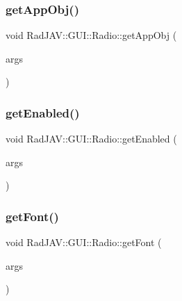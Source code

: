 \subsubsection{\texorpdfstring{get\+App\+Obj()}{getAppObj()}}
{\footnotesize\ttfamily void Rad\+J\+A\+V\+::\+G\+U\+I\+::\+Radio\+::get\+App\+Obj (\begin{DoxyParamCaption}\item[{const v8\+::\+Function\+Callback\+Info$<$ v8\+::\+Value $>$ \&}]{args }\end{DoxyParamCaption})\hspace{0.3cm}{\ttfamily [static]}}

\mbox{\label{class_rad_j_a_v_1_1_g_u_i_1_1_radio_a6dd9ce2bf30ab761488f3c3a745ae208}} 
\subsubsection{\texorpdfstring{get\+Enabled()}{getEnabled()}}
{\footnotesize\ttfamily void Rad\+J\+A\+V\+::\+G\+U\+I\+::\+Radio\+::get\+Enabled (\begin{DoxyParamCaption}\item[{const v8\+::\+Function\+Callback\+Info$<$ v8\+::\+Value $>$ \&}]{args }\end{DoxyParamCaption})\hspace{0.3cm}{\ttfamily [static]}}

\mbox{\label{class_rad_j_a_v_1_1_g_u_i_1_1_radio_abd98cf964ee354f9286c77d44cd5659c}} 
\subsubsection{\texorpdfstring{get\+Font()}{getFont()}}
{\footnotesize\ttfamily void Rad\+J\+A\+V\+::\+G\+U\+I\+::\+Radio\+::get\+Font (\begin{DoxyParamCaption}\item[{const v8\+::\+Function\+Callback\+Info$<$ v8\+::\+Value $>$ \&}]{args }\end{DoxyParamCaption})\hspace{0.3cm}{\ttfamily [static]}}

